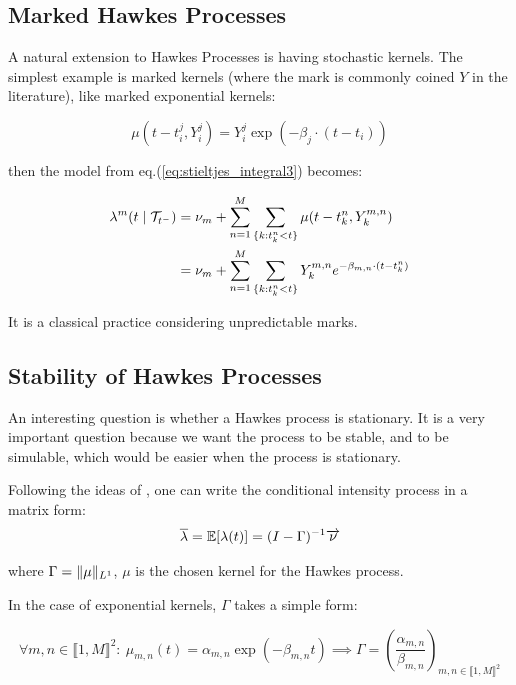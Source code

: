 \subsection{Marked Hawkes Processes}
\label{subsection:marked}
A natural extension to Hawkes Processes is having stochastic kernels. The simplest example is marked kernels (where the mark is commonly coined $Y$ in the literature), like marked exponential kernels:

$$\mu(t- t_i^j, Y_i^j) =  Y_i^j \exp \left ( - \beta_j \cdot ( t - t_i ) \right ) $$

then the model from eq.(\ref{eq:stieltjes_integral3}) becomes:

\begin{align}
\lambda^m (t \mid \mathcal{T}_{t^-} ) &= \nu_m + \sum_{n = 1}^M \sum_{ \{k: t_k^n < t \}} \mu(t- t_k^{n}, Y_k^{m,n}) \notag \\
&=  \nu_m + \sum_{n = 1}^M \sum_{ \{k: t_k^n < t \}}   Y_k^{m,n} e^{- \beta_{m,n} \cdot ( t - t_k^n ) } 
\end{align}

It is a classical practice considering unpredictable marks. 



\subsection{Stability of Hawkes Processes}



An interesting question is whether a Hawkes process is stationary. It is a very important question because we want the process to be stable, and to be simulable, which would be easier when the process is stationary.

Following the ideas of \cite{Hawkes}, one can write the conditional intensity process in a matrix form:
\begin{equation}
\overline{\lambda} = \mathbb E [ \lambda(t) ] = (I - \Gamma) ^{-1}\overrightarrow{\nu}  
\end{equation}

where $ \Gamma = \lVert \mu\rVert_{L^1} $,  $\mu$ is the chosen kernel for the Hawkes process.
 
In the case of exponential kernels, $\Gamma$ takes a simple form:

\begin{equation}
\forall m,n \in \llbracket 1, M \rrbracket^2: \  \mu_{m,n} (t) = \alpha_{m,n} \exp ( - \beta_{m,n} t ) \implies \Gamma = \left ( \frac{ \alpha_{m,n} } { \beta_{m,n} } \right )_{ m,n \in \llbracket 1, M \rrbracket^2} 
\end{equation}

